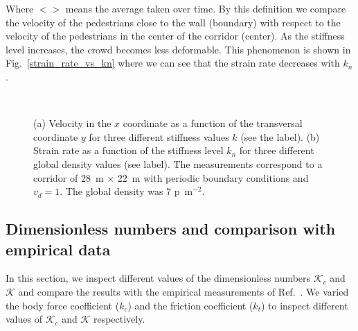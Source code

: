 \documentclass[preprint,12pt]{elsarticle}
\begin{document}
Where $<>$ means the average taken over time. By this definition we compare the velocity of the pedestrians close to the wall (boundary) with respect to the velocity of the pedestrians in the center of the corridor (center). As the stiffness level increases, the crowd becomes less deformable. This phenomenon is shown in Fig.~\ref{strain_rate_vs_kn} where we can see that the strain rate decreases with $k_n$. \\



\begin{figure}[!htbp]
\centering
    \ 
    \\
\caption[width=0.47\columnwidth]{(a) Velocity in the $x$ coordinate as a function of the transversal coordinate $y$ for three different stiffness values $k$ (see the label). (b) Strain rate as a function of the stiffness level $k_n$ for three different global density values (see label). The measurements correspond to a corridor of 28~m $\times$ 22~m with periodic boundary conditions and $v_d=1$. The global density was 7 p~m$^{-2}$.  }
\label{profile_strain}
\end{figure}


\subsection{Dimensionless numbers and comparison with empirical data}


In this section, we inspect different values of the dimensionless numbers $\mathcal{K}_c$ and $\mathcal{K}$ and compare the results with the empirical measurements of Ref.~\cite{helbing_2007}. We varied the body force coefficient ($k_c$) and the friction coefficient ($k_t$) to inspect different values of $\mathcal{K}_c$ and $\mathcal{K}$ respectively.\\
\end{document}
